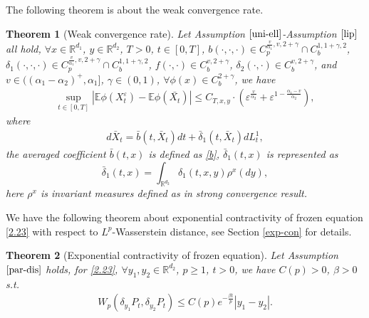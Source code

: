 \documentclass[11pt,reqno]{amsart}
\newtheorem{theorem}{\indent Theorem}[section]
\newtheorem{remark}{\indent Remark}[section]
\numberwithin{equation}{section}
\newcommand{\de}{\delta}
\begin{document}
The following theorem is about the weak convergence rate.


\begin{theorem}[Weak convergence rate]\label{WCR}
Let Assumption $\ref{uni-ell}$-Assumption $\ref{lip}$ all hold, $\forall x\in \mathbb{R}^{d_{1}}$, $y\in \mathbb{R}^{d_{2}}$,   $T>0$, $t\in[0,T]$, 
$b(\cdot,\cdot,\cdot)\in C_{p}^{\frac{v}{\alpha_{1}},v,2+\gamma}\cap C_{b}^{1,1+\gamma,2}$, $\delta_{1}(\cdot,\cdot,\cdot)\in C_{p}^{\frac{v}{\alpha_{1}},v,2+\gamma}\cap C_{b}^{1,1+\gamma,2}$, $f(\cdot,\cdot)\in C_{b}^{v,2+\gamma}$, 
$\delta_{2}(\cdot,\cdot)\in C_{b}^{v,2+\gamma}$, and $v\in((\alpha_{1}-\alpha_{2})^{+},\alpha_{1}]$,      $\gamma\in (0,1)$,  $\forall \phi(x)\in C^{2+\gamma}_{b}$,  %
we have  
\begin{align*}
	\sup_{t\in [0,T]}|\mathbb{E}\phi(X_{t}^{\varepsilon})-\mathbb{E}\phi(\bar{X_{t}})|\leq  C_{T,x,y}\cdot \left(\varepsilon^{\frac{v}{\alpha_{2}}}+\varepsilon^{1-\frac{\alpha_{1}-v}{\alpha_{2}}}\right),
\end{align*}
where
\begin{align*}
d\bar{X}_{t}=\bar{b}(t,\bar{X}_{t})dt+\bar{\delta}_{1}(t,\bar{X}_{t})dL_{t}^{1},
\end{align*}
the averaged coefficient $\bar{b}(t,x)$ is defined as \eqref{b},  $\bar{\de}_1(t,x)$ is represented as 
\begin{equation}\label{d}
	\bar{\delta}_{1}(t,x)=\int_{\mathbb{R}^{d_{2}}}\de_1(t,x,y)\rho^{x}(dy), %
\end{equation} 
here $\rho^x$ is invariant measures defined as in strong convergence result.
\end{theorem}

We have the following theorem about exponential contractivity of frozen equation \eqref{2.23} with respect to $L^p$-Wasserstein distance, see Section \ref{exp-con} for details.


\begin{theorem}[Exponential contractivity of frozen equation]\label{was-exp}
Let Assumption $\ref{par-dis}$ holds, for \eqref{2.23}, $\forall y_1,y_2\in \mathbb{R}^{d_{2}}$, $p\geq1$, $t>0$, we have $ C(p)>0$, $\beta>0$ s.t.
\begin{align*}
W_p(\delta_{y_1}P_t,\delta_{y_2}P_t)\leq C(p)e^{-\frac{\beta t}{p}}|y_1-y_2|.
\end{align*}
\end{theorem}
\end{document}
